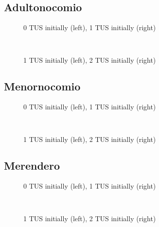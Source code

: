 \documentclass[12pt]{article}
\begin{document}
\subsection{Adultonocomio}
\begin{figure}[H]%
	\centering
	\caption*{0 TUS initially (left), 1 TUS initially (right)}
	 \quad 
	 \\
	
	\caption*{1 TUS initially (left), 2 TUS initially (right)}
	 \qquad
	\label{fig:adultonocomioTwo}%
\end{figure}

\subsection{Menornocomio}
\begin{figure}[H]%
	\centering
	\caption*{0 TUS initially (left), 1 TUS initially (right)}
	 \quad 
	 \\
	
	\caption*{1 TUS initially (left), 2 TUS initially (right)}
	 \qquad
	\label{fig:menornocomioTwo}%
\end{figure}

\subsection{Merendero}
\begin{figure}[H]%
	\centering
	\caption*{0 TUS initially (left), 1 TUS initially (right)}
	 \quad 
	 \\
	
	\caption*{1 TUS initially (left), 2 TUS initially (right)}
	 \qquad
	\label{fig:merenderoTwo}%
\end{figure}
\end{document}
